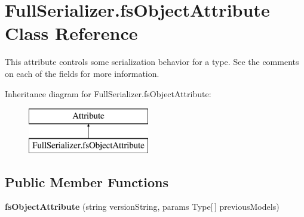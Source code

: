 \hypertarget{class_full_serializer_1_1fs_object_attribute}{}\section{Full\+Serializer.\+fs\+Object\+Attribute Class Reference}
\label{class_full_serializer_1_1fs_object_attribute}


This attribute controls some serialization behavior for a type. See the comments on each of the fields for more information.  


Inheritance diagram for Full\+Serializer.\+fs\+Object\+Attribute\+:\begin{figure}[H]
\begin{center}
\leavevmode
\includegraphics[height=2.000000cm]{class_full_serializer_1_1fs_object_attribute}
\end{center}
\end{figure}
\subsection*{Public Member Functions}
\begin{DoxyCompactItemize}
\item 
\mbox{\label{class_full_serializer_1_1fs_object_attribute_ab9564673f276f2e8b7b3865573abcce4}} 
{\bfseries fs\+Object\+Attribute} (string version\+String, params Type\mbox{[}$\,$\mbox{]} previous\+Models)
\end{DoxyCompactItemize}
